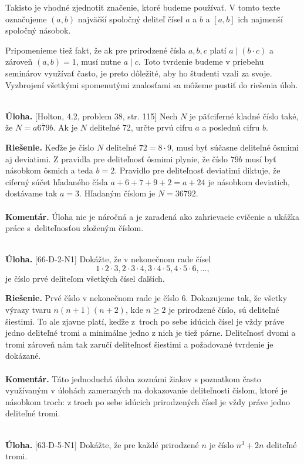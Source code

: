 \documentclass[11pt,a4paper,oneside,final]{book}
\newcommand{\kom}{\textbf{Komentár.} }
\newcommand{\ul}{\textbf{Úloha.} }
\newcommand{\rie}{\textbf{Riešenie.} }
\begin{document}
Takisto je vhodné zjednotiť značenie, ktoré budeme používať. V tomto texte označujeme $(a,b)$ najväčší spoločný deliteľ čísel $a$ a $b$ a $[a,b]$ ich najmenší spoločný násobok.

Pripomenieme tiež fakt, že ak pre prirodzené čísla $a, b, c$ platí $a \mid (b\cdot c)$ a zároveň $(a,b)=1$, musí nutne $a\mid c$. Toto tvrdenie budeme v priebehu seminárov využívať často, je preto dôležité, aby ho študenti vzali za svoje. Vyzbrojení všetkými spomenutými znalosťami sa môžeme pustiť do riešenia úloh.\\
\\
\begin{tcolorbox}[breakable,notitle,boxrule=0pt,colback=light-gray,colframe=light-gray]\ul [Holton, 4.2, problem 38, str. 115] Nech $N$ je päťciferné kladné číslo také, že $N=\overline{a679b}$. Ak je $N$ deliteľné 72, určte prvú cifru $a$ a poslednú cifru $b$.

\end{tcolorbox}

\rie Keďže je číslo $N$ deliteľné $72=8\cdot 9$, musí byť súčasne deliteľné ôsmimi aj deviatimi. Z pravidla pre deliteľnosť ôsmimi plynie, že číslo $\overline{79b}$ musí byť násobkom ôsmich a teda $b=2$. Pravidlo pre deliteľnosť deviatimi diktuje, že ciferný súčet hľadaného čísla $a+6+7+9+2=a+24$ je násobkom deviatich, dostávame tak $a=3$. Hľadaným číslom je $N=36792$.\\
\\
\kom Úloha nie je náročná a je zaradená ako zahrievacie cvičenie a ukážka práce s~deliteľnosťou zloženým číslom.\\
\\
\begin{tcolorbox}[breakable,notitle,boxrule=0pt,colback=light-gray,colframe=light-gray]\ul [66-D-2-N1] Dokážte, že v nekonečnom rade čísel
$$ 1 \cdot 2 \cdot 3, 2 \cdot 3 \cdot 4, 3 \cdot 4 \cdot 5, 4 \cdot 5 \cdot 6, \ldots ,$$
je číslo prvé deliteľom všetkých čísel ďalších.

\end{tcolorbox}

\rie Prvé číslo v nekonečnom rade je číslo 6. Dokazujeme tak, že všetky výrazy tvaru $n(n+1)(n+2)$, kde $n\geq 2$ je prirodzené číslo, sú deliteľné šiestimi. To ale zjavne platí, keďže z~troch po sebe idúcich čísel je vždy práve jedno deliteľné tromi a minimálne jedno z nich je tiež párne. Deliteľnosť dvomi a tromi zároveň nám tak zaručí deliteľnosť šiestimi a požadované tvrdenie je dokázané.\\
\\
\kom Táto jednoduchá úloha zoznámi žiakov s poznatkom často využívaným v úlohách zameraných na dokazovanie deliteľnosti číslom, ktoré je násobkom troch: z troch po sebe idúcich prirodzených čísel je vždy práve jedno deliteľné tromi.\\
\\
\begin{tcolorbox}[breakable,notitle,boxrule=0pt,colback=light-gray,colframe=light-gray]\ul [63-D-5-N1] Dokážte, že pre každé prirodzené $n$ je číslo $n^3+ 2n$ deliteľné tromi.

\end{tcolorbox}
\end{document}
